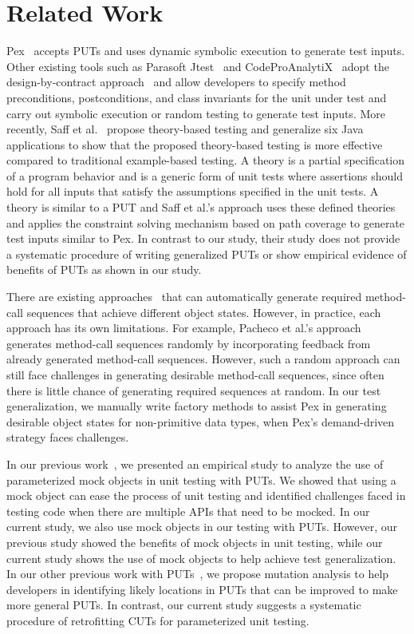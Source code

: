 \section{Related Work}
\label{sec:related}

Pex~\cite{tillmann08:pex, tillmann05:parameterized, tillmann06:unit} accepts PUTs and uses dynamic symbolic execution to generate test inputs. Other existing tools such as Parasoft Jtest~\cite{jtest} and CodeProAnalytiX~\cite{codepro} adopt the design-by-contract approach~\cite{dbc} and allow developers to specify method preconditions, postconditions, and class invariants for the unit under test and carry out symbolic execution or random testing to generate test inputs. More recently, Saff et al.~\cite{ernst:theory} propose theory-based testing and generalize six Java applications to show that the proposed theory-based testing is more effective compared to traditional example-based testing. A theory is a partial specification of a program behavior and is a generic form of unit tests where assertions should hold for all inputs that satisfy the assumptions specified in the unit tests. A theory is similar to a PUT and Saff et al.'s approach uses these defined theories and applies the constraint solving mechanism based on path coverage to generate test inputs similar to Pex. In contrast to our study, their study does not provide a systematic procedure of writing generalized PUTs or show empirical evidence of benefits of PUTs as shown in our study. 

There are existing approaches~\cite{pacheco:feedback, csallner:jcrasher, khurshid:symbolic} that can automatically generate required method-call sequences that achieve different object states. However, in practice, each approach has its own limitations. For example, Pacheco et al.'s approach~\cite{pacheco:feedback} generates method-call sequences randomly by incorporating feedback from already generated method-call sequences. However, such a random approach can still face challenges in generating desirable method-call sequences, since often there is little chance of generating required sequences at random. In our test generalization, we manually write factory methods to assist Pex in generating desirable object states for non-primitive data types, when Pex's demand-driven strategy faces challenges.

In our previous work~\cite{marri09:empirical}, we presented an empirical study to analyze the use of parameterized mock objects in unit testing with PUTs. We showed that using a mock object can ease the process of unit testing and identified challenges faced in testing code when there are multiple APIs that need to be mocked. In our current study, we also use mock objects in our testing with PUTs. However, our previous study showed the benefits of mock objects in unit testing, while our current study shows the use of mock objects to help achieve test generalization. In our other previous work with PUTs~\cite{xie09:mutation}, we propose mutation analysis to help developers in identifying likely locations in PUTs that can be improved to make more general PUTs. In contrast, our current study suggests a systematic procedure of retrofitting CUTs for parameterized unit testing.